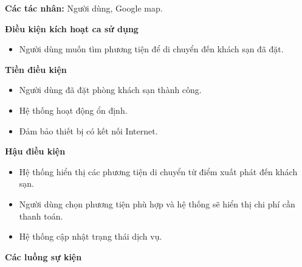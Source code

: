 \textbf{Các tác nhân:} Người dùng, Google map.

\textbf{Điều kiện kích hoạt ca sử dụng}
\begin{itemize}
    \item Người dùng muốn tìm phương tiện để di chuyển đến khách sạn đã đặt.
\end{itemize}

\textbf{Tiền điều kiện}
\begin{itemize}
    \item Người dùng đã đặt phòng khách sạn thành công.
    \item Hệ thống hoạt động ổn định.
    \item Đảm bảo thiết bị có kết nối Internet.
\end{itemize}

\textbf{Hậu điều kiện}
\begin{itemize}
    \item Hệ thống hiển thị các phương tiện di chuyển từ điểm xuất phát đến khách sạn.
    \item Người dùng chọn phương tiện phù hợp và hệ thống sẽ hiển thị chi phí cần thanh toán.
    \item Hệ thống cập nhật trạng thái dịch vụ.
\end{itemize}

\textbf{Các luồng sự kiện}

